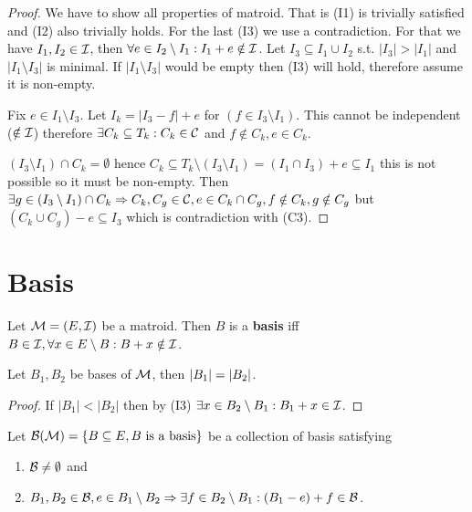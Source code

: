 \begin{proof}
	We have to show all properties of matroid. That is (I1) is trivially satisfied and (I2) also trivially holds. For the last (I3) we use a contradiction. For that we have $I_1, I_2 \in \mathcal{I}$, then $\forall e \in I_2 \setminus I_1 : I_1 + e \notin \mathcal{I}$. Let $I_3 \subseteq I_1 \cup I_2$ s.t. $|I_3| > |I_1|$ and $|I_1 \setminus I_3|$ is minimal. If $|I_1 \setminus I_3|$ would be empty then (I3) will hold, therefore assume it is non-empty.
	
	Fix $e \in I_1 \setminus I_3$. Let $I_k = |I_3 - f| +e$ for $(f \in I_3 \setminus I_1)$. This cannot be independent ($\notin \mathcal{I}$) therefore $\exists C_k \subseteq T_k : C_k \in \mathcal{C}$ and $f \notin C_k, e \in C_k$.
	
	$(I_3 \setminus I_1) \cap C_k = \emptyset$ hence $C_k \subseteq T_k \setminus (I_3 \setminus I_1) = (I_1 \cap I_3) + e \subseteq I_1$ this is not possible so it must be non-empty. Then $\exists g \in (I_3 \setminus I_1) \cap C_k \Rightarrow C_k, C_g \in \mathcal{C}, e \in C_k \cap C_g, f \notin C_k, g \notin C_g$ but $(C_k \cup C_g) - e \subseteq I_3$ which is contradiction with (C3).
\end{proof}

\section{Basis}

\begin{defn}
	Let $\mathcal{M} = (E, \mathcal{I})$ be a matroid. Then $B$ is a \textbf{basis} iff $B \in \mathcal{I}, \forall x \in E \setminus B: B + x \notin \mathcal{I}$.
\end{defn}

\begin{prop}
	Let $B_1, B_2$ be bases of $\mathcal{M}$, then $\left|{B_1}\right| = \left|{B_2}\right|$.
\end{prop}

\begin{proof}
	If $|B_1| < |B_2|$ then by (I3) $\exists x \in B_2 \setminus B_1 : B_1 + x \in \mathcal{I}$.
\end{proof}

\begin{defn}
	Let $\mathcal{B} (\mathcal{M}) = \{B \subseteq E , B \text{ is a basis}\}$ be a collection of basis satisfying
	
	\begin{enumerate}[(B1)]
		\item $\mathcal{B} \neq \emptyset$ and
		\item $B_1, B_2 \in \mathcal{B}, e \in B_1 \setminus B_2 \Rightarrow \exists f \in B_2 \setminus B_1 : (B_1 - e) + f \in \mathcal{B}$.
	\end{enumerate}
\end{defn}

